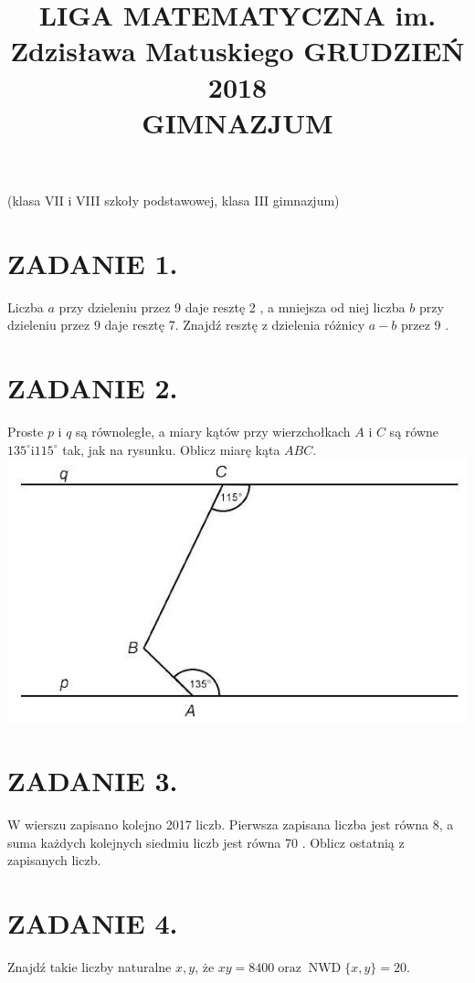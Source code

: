 \documentclass[10pt]{article}
\title{LIGA MATEMATYCZNA im. Zdzisława Matuskiego GRUDZIEŃ 2018 \\
 GIMNAZJUM }
\author{}
\date{}
\begin{document}
\maketitle
(klasa VII i VIII szkoły podstawowej, klasa III gimnazjum)

\section*{ZADANIE 1.}
Liczba \(a\) przy dzieleniu przez 9 daje resztę 2 , a mniejsza od niej liczba \(b\) przy dzieleniu przez 9 daje resztę 7. Znajdź resztę z dzielenia różnicy \(a-b\) przez 9 .

\section*{ZADANIE 2.}
Proste \(p\) i \(q\) są równoległe, a miary kątów przy wierzchołkach \(A\) i \(C\) są równe \(135^{\circ} \mathrm{i} 115^{\circ}\) tak, jak na rysunku. Oblicz miarę kąta \(A B C\).\\
\includegraphics[max width=\textwidth, center]{2024_11_21_aa1016cdd95200a39755g-1(1)}

\section*{ZADANIE 3.}
W wierszu zapisano kolejno 2017 liczb. Pierwsza zapisana liczba jest równa 8, a suma każdych kolejnych siedmiu liczb jest równa 70 . Oblicz ostatnią z zapisanych liczb.

\section*{ZADANIE 4.}
Znajdź takie liczby naturalne \(x, y\), że \(x y=8400 \operatorname{oraz} \operatorname{NWD}\{x, y\}=20\).
\end{document}
